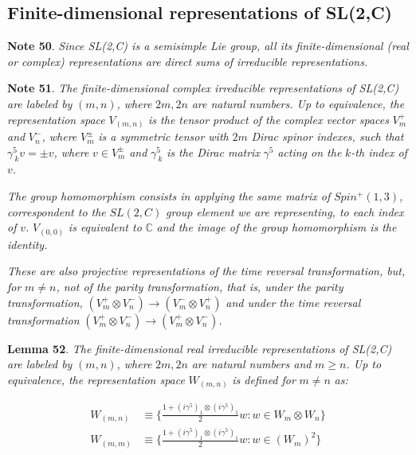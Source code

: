 \documentclass[11pt]{book}
\begin{document}
\hypertarget{finite-dimensional-representations-of-sl2c}{%
\subsection{Finite-dimensional representations of
SL(2,C)}\label{finite-dimensional-representations-of-sl2c}}

\textbf{Note 50}. \emph{Since SL(2,C) is a semisimple Lie group, all its
finite-dimensional (real or complex) representations are direct sums of
irreducible representations.}

\textbf{Note 51}. \emph{The finite-dimensional complex irreducible
representations of SL(2,C) are labeled by }\((m,n)\)\emph{, where
}\(2m,2n\)\emph{ are natural numbers. Up to equivalence, the
representation space }\(V_{(m,n)}\)\emph{ is the tensor product of the
complex vector spaces }\(V_m^+\)\emph{ and }\(V_n^-\)\emph{, where
}\(V_m^\pm\)\emph{ is a symmetric tensor with }\(2m\)\emph{ Dirac spinor
indexes, such that }\(\gamma^5_{\  k}v=\pm v\)\emph{, where
}\(v\in V_m^\pm\)\emph{ and }\(\gamma^5_{\  k}\)\emph{ is the Dirac
matrix }\(\gamma^5\)\emph{ acting on the }\(k\)\emph{-th index of
}\(v\)\emph{.}

\emph{The group homomorphism consists in applying the same matrix of
}\(Spin^+(1,3)\)\emph{, correspondent to the }\(SL(2,C)\)\emph{ group
element we are representing, to each index of }\(v\)\emph{.
}\(V_{(0,0)}\)\emph{ is equivalent to }\(\mathbb{C}\)\emph{ and the
image of the group homomorphism is the identity.}

\emph{These are also projective representations of the time reversal
transformation, but, for }\(m\neq n\)\emph{, not of the parity
transformation, that is, under the parity transformation,
}\((V^+_m\otimes V^-_n)\to (V^-_m\otimes V^+_n)\)\emph{ and under the
time reversal transformation
}\((V^+_m\otimes V^-_n)\to (V^+_m\otimes V^-_n)\)\emph{.}

\textbf{Lemma 52}. \emph{The finite-dimensional real irreducible
representations of SL(2,C) are labeled by }\((m,n)\)\emph{, where
}\(2m,2n\)\emph{ are natural numbers and }\(m\geq
n\)\emph{. Up to equivalence, the representation space
}\(W_{(m,n)}\)\emph{ is defined for }\(m\neq n\)\emph{ as: }

\begin{equation}\begin{aligned}
W_{(m,n)}&\equiv \{\frac{1+(i\gamma^5)_1\otimes
   (i\gamma^5)_1}{2}w: w\in W_m\otimes W_n\}\\
W_{(m,m)}&\equiv 
\{\frac{1+(i\gamma^5)_1\otimes(i\gamma^5)_1}{2}w: w\in (W_m)^2\}\end{aligned}\end{equation}
\end{document}
